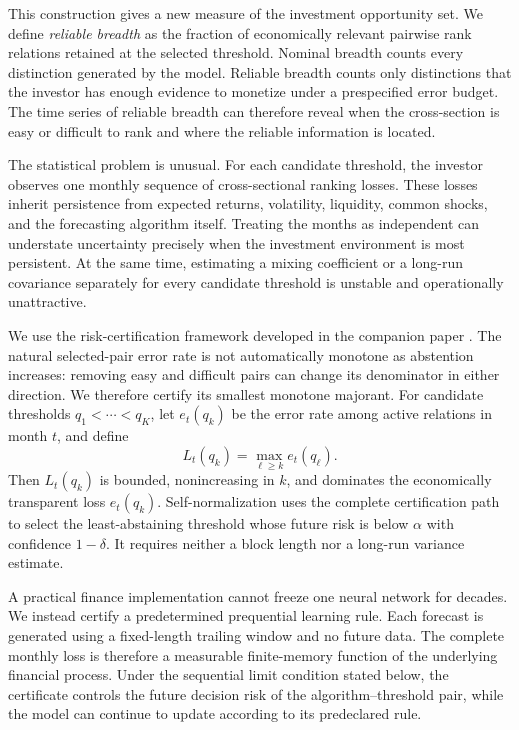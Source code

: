 This construction gives a new measure of the investment opportunity set. We define \emph{reliable breadth} as the fraction of economically relevant pairwise rank relations retained at the selected threshold. Nominal breadth counts every distinction generated by the model. Reliable breadth counts only distinctions that the investor has enough evidence to monetize under a prespecified error budget. The time series of reliable breadth can therefore reveal when the cross-section is easy or difficult to rank and where the reliable information is located.

The statistical problem is unusual. For each candidate threshold, the investor observes one monthly sequence of cross-sectional ranking losses. These losses inherit persistence from expected returns, volatility, liquidity, common shocks, and the forecasting algorithm itself. Treating the months as independent can understate uncertainty precisely when the investment environment is most persistent. At the same time, estimating a mixing coefficient or a long-run covariance separately for every candidate threshold is unstable and operationally unattractive.

We use the risk-certification framework developed in the companion paper \citet{Bignozzi2026SNRCPS}. The natural selected-pair error rate is not automatically monotone as abstention increases: removing easy and difficult pairs can change its denominator in either direction. We therefore certify its smallest monotone majorant. For candidate thresholds $q_1<\cdots<q_K$, let $e_t(q_k)$ be the error rate among active relations in month $t$, and define
\[
L_t(q_k)
=
\max_{\ell\geq k}e_t(q_\ell).
\]
Then $L_t(q_k)$ is bounded, nonincreasing in $k$, and dominates the economically transparent loss $e_t(q_k)$. Self-normalization uses the complete certification path to select the least-abstaining threshold whose future risk is below $\alpha$ with confidence $1-\delta$. It requires neither a block length nor a long-run variance estimate.

A practical finance implementation cannot freeze one neural network for decades. We instead certify a predetermined prequential learning rule. Each forecast is generated using a fixed-length trailing window and no future data. The complete monthly loss is therefore a measurable finite-memory function of the underlying financial process. Under the sequential limit condition stated below, the certificate controls the future decision risk of the algorithm--threshold pair, while the model can continue to update according to its predeclared rule.

